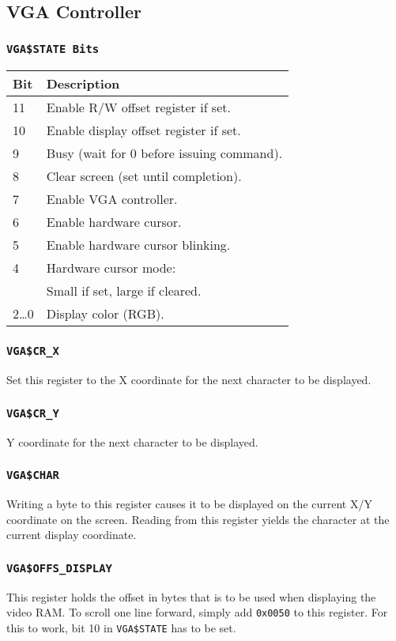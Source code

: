 \documentclass{leaflet}
\begin{document}
  \subsection{VGA Controller}
   \subsubsection{\texttt{VGA\$STATE Bits}}
    \begin{center}
     \begin{longtable}{|l|l|}
      \hline
      Bit&Description\\
      \hline
      \hline
      11&Enable R/W offset register if set.\\
      10&Enable display offset register if set.\\
      9&Busy (wait for 0 before issuing command).\\
      8&Clear screen (set until completion).\\
      7&Enable VGA controller.\\
      6&Enable hardware cursor.\\
      5&Enable hardware cursor blinking.\\
      4&Hardware cursor mode:\\
       &Small if set, large if cleared.\\
      2\dots 0&Display color (RGB).\\
      \hline
     \end{longtable}
    \end{center}
   \subsubsection{\texttt{VGA\$CR\_X}}
    Set this register to the X coordinate for the next character to be 
    displayed.
   \subsubsection{\texttt{VGA\$CR\_Y}}
    Y coordinate for the next character to be displayed.
   \subsubsection{\texttt{VGA\$CHAR}}
    Writing a byte to this register causes it to be displayed on the current
    X/Y coordinate on the screen. Reading from this register yields the 
    character at the current display coordinate.
   \subsubsection{\texttt{VGA\$OFFS\_DISPLAY}}
    This register holds the offset in bytes that is to be used when displaying
    the video RAM. To scroll one line forward, simply add \texttt{0x0050} to 
    this register. For this to work, bit 10 in \texttt{VGA\$STATE} has to be
    set.
\end{document}
